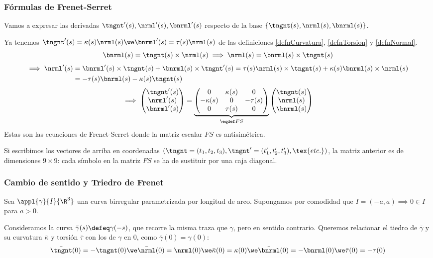 \subsubsection{Fórmulas de Frenet-Serret}
Vamos a expresar las derivadas $\tngnt'(s), \nrml'(s), \bnrml'(s)$ respecto de la base $\{\tngnt(s), \nrml(s), \bnrml(s)\}$.

Ya tenemos $\tngnt'(s) = \kappa(s)\nrml(s) \we \bnrml'(s)=\tau(s)\nrml(s)$ de las definiciones \ref{defnCurvatura}, \ref{defnTorsion} y \ref{defnNormal}.
\[\bnrml(s)=\tngnt(s)\times\nrml(s) \implies \nrml(s) = \bnrml(s)\times\tngnt(s)\]
\[\begin{aligned}
		\implies \nrml'(s) & =\bnrml'(s)\times\tngnt(s) + \bnrml(s)\times\tngnt'(s) = \tau(s)\nrml(s)\times\tngnt(s) + \kappa(s)\bnrml(s)\times\nrml(s) \\
		                   & =-\tau(s)\bnrml(s)-\kappa(s)\tngnt(s)
	\end{aligned}\]
\[\implies \begin{pmatrix}
		\tngnt'(s) \\ \nrml'(s) \\ \bnrml'(s)
	\end{pmatrix} = \underbrace{\begin{pmatrix}
			0          & \kappa(s) & 0        \\
			-\kappa(s) & 0         & -\tau(s) \\
			0          & \tau(s)   & 0
		\end{pmatrix}}_{\eqdef FS}\begin{pmatrix}
		\tngnt(s) \\ \nrml(s) \\ \bnrml(s)
	\end{pmatrix}\]
Estas son las ecuaciones de Frenet-Serret donde la matriz escalar $FS$ es antisimétrica.

Si escribimos los vectores de arriba en coordenadas $(\tngnt=(t_1, t_2, t_3), \tngnt'=(t_1', t_2', t_3'), \tex{ etc.})$, la matriz anterior es de dimensiones $9\times9$: cada símbolo en la matriz $FS$ se ha de sustituir por una caja diagonal.

\subsubsection{Cambio de sentido y Triedro de Frenet}
Sea $\appl{\gamma}{I}{\R^3}$ una curva birregular parametrizada por longitud de arco. Supongamos por comodidad que $I = (-a, a) \implies 0\in I$ para $a>0$.

Consideramos la curva $\bar{\gamma}(s)\defeq\gamma(-s)$, que recorre la misma traza que $\gamma$, pero en sentido contrario. Queremos relacionar el tiedro de $\bar{\gamma}$ y su curvatura $\bar{\kappa}$ y torsión $\bar{\tau}$ con los de $\gamma$ en $0$, como $\bar{\gamma} (0)=\gamma(0)$:
\[\bar{\tngnt}(0)=-\tngnt(0) \we \bar{\nrml}(0)=\nrml(0) \we \bar{\kappa}(0)=\kappa(0) \we \bar{\bnrml}(0)=-\bnrml(0) \we \bar{\tau}(0)=-
	\tau(0)\]

